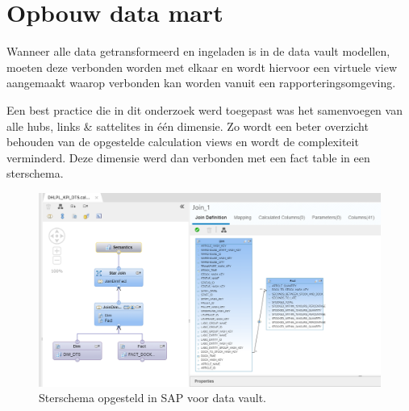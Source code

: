 \section{Opbouw data mart}
Wanneer alle data getransformeerd en ingeladen is in de data vault modellen, moeten deze verbonden worden met elkaar en wordt hiervoor een virtuele view aangemaakt waarop verbonden kan worden vanuit een rapporteringsomgeving.

Een best practice die in dit onderzoek werd toegepast was het samenvoegen van alle hubs, links \& sattelites in één dimensie. Zo wordt een beter overzicht behouden van de opgestelde calculation views en wordt de complexiteit verminderd. Deze dimensie werd dan verbonden met een fact table in een sterschema. 

\begin{figure}[h]
	\centering
	\includegraphics[scale=0.5]{../images/DV_FG_datamart.png}
	\caption{Sterschema opgesteld in SAP voor data vault.}
	\label{fig:dvdm}
\end{figure}
